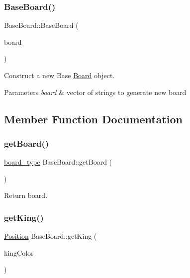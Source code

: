 \subsubsection{\texorpdfstring{Base\+Board()}{BaseBoard()}}
{\footnotesize\ttfamily Base\+Board\+::\+Base\+Board (\begin{DoxyParamCaption}\item[{std\+::vector$<$ std\+::vector$<$ std\+::string $>$$>$}]{board }\end{DoxyParamCaption})}



Construct a new Base \hyperlink{class_board}{Board} object. 


\begin{DoxyParams}{Parameters}
{\em board} & vector of strings to generate new board \\
\hline
\end{DoxyParams}


\subsection{Member Function Documentation}
\mbox{\label{class_base_board_af8f8bdfb2aa7049b30efa40ea9acca20}} 
\subsubsection{\texorpdfstring{get\+Board()}{getBoard()}}
{\footnotesize\ttfamily \hyperlink{_a_i_class_8h_a6e73002e9c84a7986c39d7e80e83dc8d}{board\+\_\+type} Base\+Board\+::get\+Board (\begin{DoxyParamCaption}{ }\end{DoxyParamCaption})}



Return board. 

\mbox{\label{class_base_board_aebcd17c243c0748897b41fe683dd29f1}} 
\subsubsection{\texorpdfstring{get\+King()}{getKing()}}
{\footnotesize\ttfamily \hyperlink{struct_position}{Position} Base\+Board\+::get\+King (\begin{DoxyParamCaption}\item[{\hyperlink{_piece_8h_ad7595c48bb74c0dd2a7648712a2d4985}{Piece\+Color}}]{king\+Color }\end{DoxyParamCaption})}


